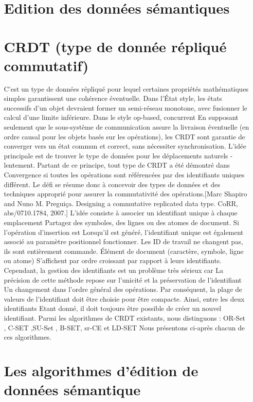\documentclass[12pt]{report}
\begin{document}
\section{Edition des données sémantiques}



\section{CRDT (type de donnée répliqué commutatif)}
C'est un type de données répliqué pour lequel certaines propriétés mathématiques simples garantissent une cohérence éventuelle. Dans l’État style, les états successifs d’un objet devraient former un semi-réseau monotone, avec fusionner le calcul d’une limite inférieure. Dans le style op-based, concurrent En supposant seulement que le sous-système de communication assure la livraison éventuelle (en ordre causal pour les objets basés sur les opérations), les CRDT sont garantie de converger vers un état commun et correct, sans nécessiter synchronisation. 
L'idée principale est de trouver le type de données pour les déplacements naturels -
lentement. Partant de ce principe, tout type de CRDT a été démontré dans 
Convergence si toutes les opérations sont référencées par des identifiants uniques
différent. Le défi se résume donc à concevoir des types de données et des techniques
approprié pour assurer la commutativité des opérations.[Marc Shapiro and Nuno M. Preguiça. Designing a commutative replicated
data type. CoRR, abs/0710.1784, 2007.]
L'idée consiste à associer un identifiant unique à chaque emplacement
Partagez des symboles, des lignes ou des atomes de document. Si l'opération d'insertion est
Lorsqu'il est généré, l'identifiant unique est également associé au paramètre positionnel
fonctionner. Les ID de travail ne changent pas, ils sont entièrement
commande. Élément de document (caractère, symbole, ligne ou atome)
S'affichent par ordre croissant par rapport à leurs identifiants.
Cependant, la gestion des identifiants est un problème très sérieux car La précision de cette méthode repose sur l'unicité et la préservation de l'identifiant Un changement dans l'ordre général des opérations. Par conséquent, la plage de valeurs de l'identifiant doit être choisie pour être compacte. Ainsi, entre les deux identifiants Etant donné, il doit toujours être possible de créer un nouvel identifiant. 
Parmi les algorithmes de CRDT existants, nous distinguons : OR-Set , C-SET ,SU-Set , B-SET, sr-CE et LD-SET Nous présentons ci-après chacun de ces algorithmes.
\section{Les algorithmes d'édition de données sémantique}
\end{document}
